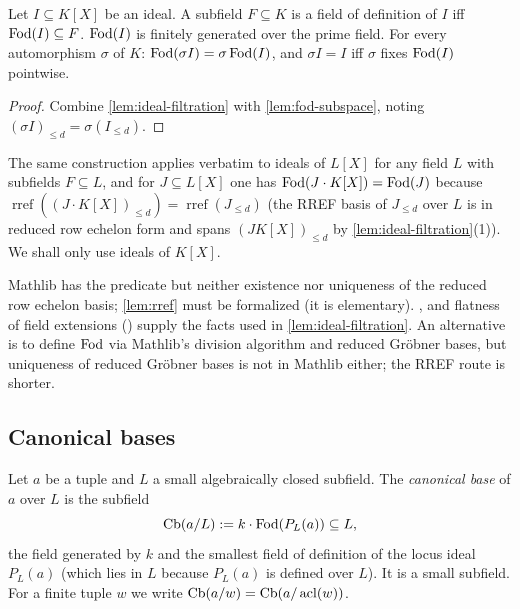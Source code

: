 \begin{theorem}[Weil]\label{thm:weil-fod}
Let $I\subseteq K[X]$ be an ideal.  A subfield $F\subseteq K$ is a field of definition
of $I$ iff $\operatorname{Fod}(I)\subseteq F$.  $\operatorname{Fod}(I)$ is finitely generated over the prime field.
For every automorphism $\sigma$ of $K$: $\operatorname{Fod}(\sigma I)=\sigma\operatorname{Fod}(I)$, and $\sigma I=I$
iff $\sigma$ fixes $\operatorname{Fod}(I)$ pointwise.
\end{theorem}
\begin{proof}
Combine \cref{lem:ideal-filtration} with \cref{lem:fod-subspace}, noting
$(\sigma I)_{\le d}=\sigma(I_{\le d})$.
\end{proof}

\begin{remark}
The same construction applies verbatim to ideals of $L[X]$ for any field $L$ with
subfields $F\subseteq L$, and for $J\subseteq L[X]$ one has $\operatorname{Fod}(J\cdot K[X])=\operatorname{Fod}(J)$
because $\operatorname{rref}((J\cdot K[X])_{\le d})=\operatorname{rref}(J_{\le d})$
(the RREF basis of $J_{\le d}$ over $L$ is in reduced row echelon form and spans
$(J K[X])_{\le d}$ by \cref{lem:ideal-filtration}(1)).  We shall only use ideals of
$K[X]$.
\end{remark}

\begin{leannote}
Mathlib has the predicate  but neither existence nor
uniqueness of the reduced row echelon basis; \cref{lem:rref} must be formalized (it is
elementary).  ,  and flatness of
field extensions () supply the facts used in
\cref{lem:ideal-filtration}.  An alternative is to define $\operatorname{Fod}$ via Mathlib's
 division algorithm and reduced Gr\"obner bases, but uniqueness of
reduced Gr\"obner bases is not in Mathlib either; the RREF route is shorter.
\end{leannote}

\subsection{Canonical bases}

\begin{definition}\label{def:cb}
Let $a$ be a tuple and $L$ a small algebraically closed subfield.  The
\emph{canonical base} of $a$ over $L$ is the subfield
\[
   \operatorname{Cb}(a/L):=k\cdot\operatorname{Fod}(P_L(a))\subseteq L,
\]
the field generated by $k$ and the smallest field of definition of the locus ideal
$P_L(a)$ (which lies in $L$ because $P_L(a)$ is defined over $L$).  It is a small
subfield.  For a finite tuple $w$ we write $\operatorname{Cb}(a/w)=\operatorname{Cb}(a/\operatorname{acl}(w))$.
\end{definition}

